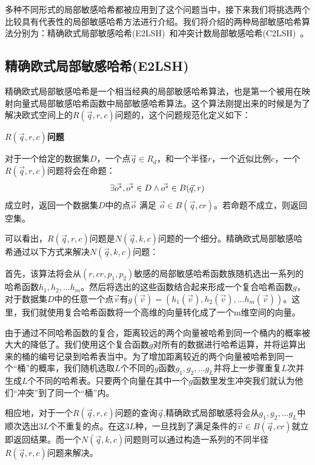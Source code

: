 多种不同形式的局部敏感哈希都被应用到了这个问题当中，接下来我们将挑选两个比较具有代表性的局部敏感哈希方法进行介绍。我们将介绍的两种局部敏感哈希算法分别为：精确欧式局部敏感哈希(E2LSH)~\cite{lazy18*}和冲突计数局部敏感哈希(C2LSH)~\cite{lazy21}。

\subsection{精确欧式局部敏感哈希(E2LSH)}

精确欧式局部敏感哈希是一个相当经典的局部敏感哈希算法，也是第一个被用在映射向量式局部敏感哈希函数中局部敏感哈希算法。这个算法刚提出来的时候是为了解决欧式空间上的$ R(\vec{q},r,c) $问题的，这个问题规范化定义如下：

\begin{definition}
	{\bf $ R(\vec{q},r,c) $问题}
	
	对于一个给定的数据集$ D $，一个点$ \vec{q} \in R_d $，和一个半径$ r $，一个近似比例$ c $，一个$ R(\vec{q},r,c) $问题将会在命题：	
	\begin{multline*}
		{\centering \exists\vec{o^*},\vec{o^*}\in D\land\vec{o^*}\in B(\vec{q},r)}
	\end{multline*}	
	成立时，返回一个数据集$ D $中的点$ \vec{o} $ 满足 $ \vec{o} \in B(\vec{q},cr) $。若命题不成立，则返回空集。
\end{definition}
	
可以看出，$ R(\vec{q},r,c) $问题是$ N(\vec{q},k,c) $问题的一个细分。精确欧式局部敏感哈希通过以下方式来解决$ N(\vec{q},k,c) $问题：

首先，该算法将会从$ (r,cr,p_1,p_2) $敏感的局部敏感哈希函数族随机选出一系列的哈希函数$ h_1,h_2,\dots h_m $。然后将选出的这些函数结合起来形成一个复合哈希函数$ g $，对于数据集$ D $中的任意一个点$ \vec{v} $有$ g(\vec{v}) = (h_1(\vec{v}),h_2(\vec{v}),\dots h_m(\vec{v})) $。这里，我们就使用复合哈希函数将一个高维的向量转化成了一个m维空间的向量。

由于通过不同哈希函数的复合，距离较远的两个向量被哈希到同一个桶内的概率被大大的降低了。我们使用这个复合函数$ g $对所有的数据进行哈希运算，并将运算出来的桶的编号记录到哈希表当中。为了增加距离较近的两个向量被哈希到同一个“桶”的概率，我们随机选取$ L $个不同的$ g $函数$ g_1,g_2,\dots g_L  $并将上一步骤重复$ L $次并生成$ L $个不同的哈希表。只要两个向量在其中一个$ g $函数里发生冲突我们就认为他们“冲突”到了同一个“桶”内。

相应地，对于一个$ R(\vec{q},r,c) $问题的查询$ \vec{q} $,精确欧式局部敏感将会从$ g_1,g_2,\dots g_L  $中顺次选出$ 3L $个不重复的点。在这$ 3L $种，一旦找到了满足条件的$ \vec{v} \in B(\vec{q},cr) $就立即返回结果。而一个$ N(\vec{q},k,c) $问题则可以通过构造一系列的不同半径$ R(\vec{q},r,c) $问题来解决。



